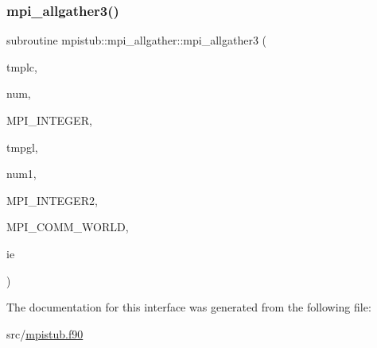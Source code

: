 \mbox{\label{interfacempistub_1_1mpi__allgather_a32287150b908808c61f3acb19402c6c8}} 
\subsubsection{\texorpdfstring{mpi\_allgather3()}{mpi\_allgather3()}}
{\footnotesize\ttfamily subroutine mpistub\+::mpi\+\_\+allgather\+::mpi\+\_\+allgather3 (\begin{DoxyParamCaption}\item[{integer, dimension(\+:)}]{tmplc,  }\item[{}]{num,  }\item[{}]{M\+P\+I\+\_\+\+I\+N\+T\+E\+G\+ER,  }\item[{integer, dimension(\+:)}]{tmpgl,  }\item[{}]{num1,  }\item[{}]{M\+P\+I\+\_\+\+I\+N\+T\+E\+G\+E\+R2,  }\item[{}]{M\+P\+I\+\_\+\+C\+O\+M\+M\+\_\+\+W\+O\+R\+LD,  }\item[{}]{ie }\end{DoxyParamCaption})}



The documentation for this interface was generated from the following file\+:\begin{DoxyCompactItemize}
\item 
src/\mbox{\hyperlink{mpistub_8f90}{mpistub.\+f90}}\end{DoxyCompactItemize}
